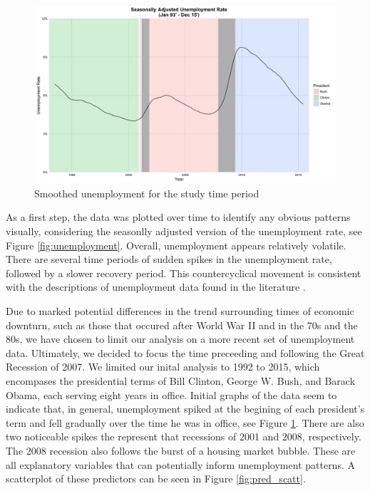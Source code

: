 \documentclass[twoside,twocolumn]{article}
\begin{document}
			\begin{figure}[H]
		\centering
		\caption{Smoothed unemployment for the study time period}
		\label{fig:presunemp}
		\includegraphics[width=\linewidth]{images/presunemp}
	\end{figure}


As a first step, the data was plotted over time to identify any obvious patterns visually, considering the seasonlly adjusted version of the unemployment rate, see Figure \ref{fig:unemployment}.  Overall, unemployment appears relatively volatile.  There are several time periods of sudden spikes in the unemployment rate, followed by a slower recovery period. This countercyclical movement is consistent with the descriptions of unemployment data found in the literature \citep{katz2010, Montgomery1998, shimer2012reassessing}. 

Due to marked potential differences in the trend surrounding times of economic downturn, such as those that occured after World War II and in the 70s and the 80s, we have chosen to limit our analysis on a more recent set of unemployment data. Ultimately, we decided to focus the time preceeding and following the Great Recession of 2007. We limited our inital analysis to 1992 to 2015, which encompases the presidential terms of Bill Clinton, George W. Bush, and Barack Obama, each serving eight years in office.  Initial graphs of the data seem to indicate that, in general, unemployment spiked at the begining of each president's term and fell gradually over the time he was in office, see Figure \ref{fig:presunemp}. There are also two noticeable spikes the represent that recessions of 2001 and 2008, respectively.  The 2008 recession also follows the burst of a housing market bubble.  These are all explanatory variables that can potentially inform unemployment patterns. A scatterplot of these predictors can be seen in Figure \ref{fig:pred_scatt}.
\end{document}
